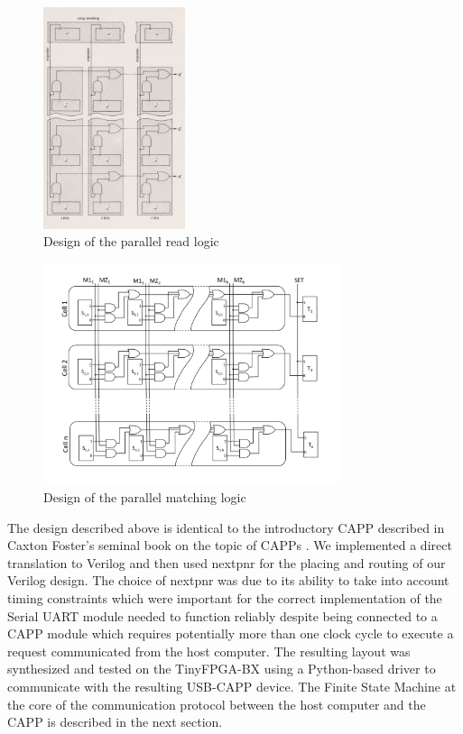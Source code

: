 \begin{figure}
  \includegraphics[height=6.5cm]{FPGA-CAPP research paper/images/read_lines.png}
  \caption{Design of the parallel read logic}
  \label{read_lines}
\end{figure}

\begin{figure}
  \includegraphics[height=6.5cm]{FPGA-CAPP research paper/images/mismatch_lines.png}
  \caption{Design of the parallel matching logic}
  \label{mismatch_lines}
\end{figure}

The design described above is identical to the introductory CAPP described in Caxton Foster's seminal book on the topic of CAPPs \cite{capp}. We implemented a direct translation to Verilog and then used nextpnr \cite{8735573} for the placing and routing of our Verilog design. The choice of nextpnr was due to its ability to take into account timing constraints which were important for the correct implementation of the Serial UART module needed to function reliably despite being connected to a CAPP module which requires potentially more than one clock cycle to execute a request communicated from the host computer. The resulting layout was synthesized and tested on the TinyFPGA-BX using a Python-based driver to communicate with the resulting USB-CAPP device.
The Finite State Machine at the core of the communication protocol between the host computer and the CAPP is described in the next section.